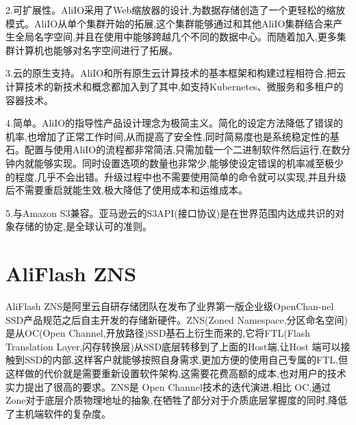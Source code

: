 2.可扩展性。AliIO采用了Web缩放器的设计,为数据存储创造了一个更轻松的缩放模式。AliIO从单个集群开始的拓展,这个集群能够通过和其他AliIO集群结合来产生全局名字空间,并且在使用中能够跨越几个不同的数据中心。而随着加入,更多集群计算机也能够对名字空间进行了拓展。

3.云的原生支持。AliIO和所有原生云计算技术的基本框架和构建过程相符合,把云计算技术的新技术和概念都加入到了其中,如支持Kubernetes、微服务和多租户的容器技术。

4.简单。AliIO的指导性产品设计理念为极简主义。简化的设定方法降低了错误的机率,也增加了正常工作时间,从而提高了安全性,同时简易度也是系统稳定性的基石。配置与使用AliIO的流程都非常简洁,只需加载一个二进制软件然后运行,在数分钟内就能够实现。同时设置选项的数量也非常少,能够使设定错误的机率减至极少的程度,几乎不会出错。升级过程中也不需要使用简单的命令就可以实现,并且升级后不需要重启就能生效,极大降低了使用成本和运维成本。

5.与Amazon S3兼容。亚马逊云的S3API(接口协议)是在世界范围内达成共识的对象存储的协定,是全球认可的准则。



\section{AliFlash ZNS}




AliFlash ZNS是阿里云自研存储团队在发布了业界第一版企业级OpenChan-nel SSD产品规范之后自主开发的存储新硬件。ZNS(Zoned Namespace,分区命名空间)是从OC(Open Channel,开放路径)SSD基石上衍生而来的,它将FTL(Flash Translation Layer,闪存转换层)从SSD底层转移到了上面的Host端,让Host 
端可以接触到SSD的内部,这样客户就能够按照自身需求,更加方便的使用自己专属的FTL,但这样做的代价就是需要重新设置软件架构,这需要花费高额的成本,也对用户的技术实力提出了很高的要求。ZNS是 Open Channel技术的迭代演进,相比 OC,通过 Zone对于底层介质物理地址的抽象,在牺牲了部分对于介质底层掌握度的同时,降低了主机端软件的复杂度。


